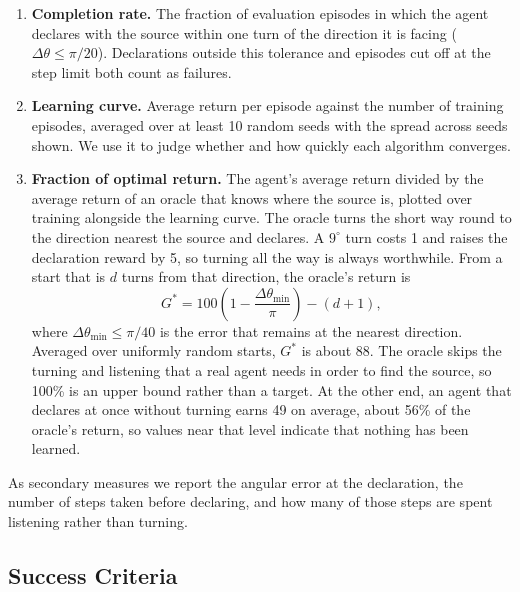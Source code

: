 \documentclass{article}
\begin{document}
\begin{enumerate}
  \item \textbf{Completion rate.} The fraction of evaluation episodes in which
  the agent declares with the source within one turn of the direction it is
  facing ($\Delta\theta \le \pi/20$). Declarations outside this tolerance and
  episodes cut off at the step limit both count as failures.
  \item \textbf{Learning curve.} Average return per episode against the number
  of training episodes, averaged over at least 10 random seeds with the spread
  across seeds shown. We use it to judge whether and how quickly each
  algorithm converges.
  \item \textbf{Fraction of optimal return.} The agent's average return
  divided by the average return of an oracle that knows where the source is,
  plotted over training alongside the learning curve. The oracle turns the
  short way round to the direction nearest the source and declares. A $9^\circ$
  turn costs 1 and raises the declaration reward by 5, so turning all the way
  is always worthwhile. From a start that is $d$ turns from that direction,
  the oracle's return is
  \begin{equation}
    G^{*} = 100\left(1 - \frac{\Delta\theta_{\min}}{\pi}\right) - (d + 1),
  \end{equation}
  where $\Delta\theta_{\min} \le \pi/40$ is the error that remains at the
  nearest direction. Averaged over uniformly random starts, $G^{*}$ is about
  88. The oracle skips the turning and listening that a real agent needs in
  order to find the source, so 100\% is an upper bound rather than a target.
  At the other end, an agent that declares at once without turning earns 49
  on average, about 56\% of the oracle's return, so values near that level
  indicate that nothing has been learned.
\end{enumerate}

As secondary measures we report the angular error at the declaration, the
number of steps taken before declaring, and how many of those steps are
spent listening rather than turning.

\subsection{Success Criteria}
\end{document}
